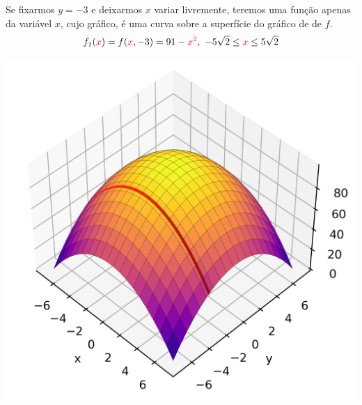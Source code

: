%
%
%
%
%
%


\begin{frame}
Se fixarmos $y=-3$ e deixarmos {\color{red}$x$} variar livremente, teremos uma função apenas da variável {\color{red}$x$}, cujo gráfico, é uma curva sobre a superfície do gráfico de de $f$.
\[f_1({\color{red}x})=f({\color{red}x},-3)=91-{\color{red}x^2}, \ -5\sqrt{2}\leq {\color{red}x}\leq 5\sqrt{2} \]

	
\begin{center}
	\includegraphics[scale=0.6]{figuras/der-parc2-2.png}
\end{center}
\end{frame}

